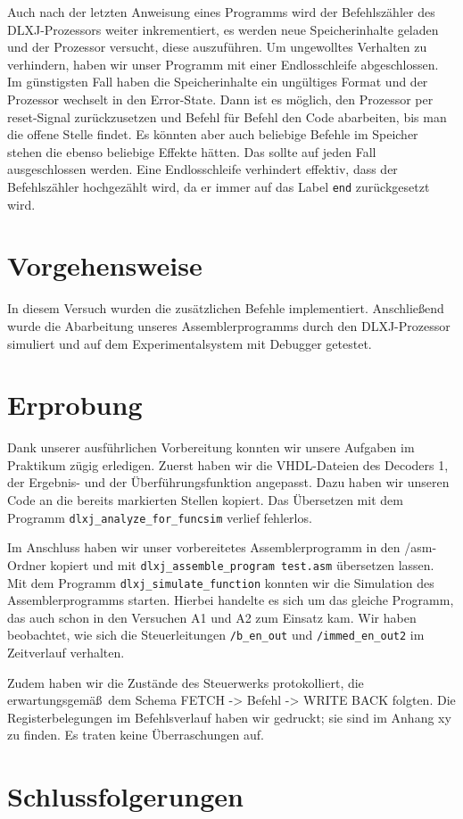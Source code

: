 \documentclass[12pt,a4paper]{scrartcl}
\begin{document}
Auch nach der letzten Anweisung eines Programms wird der Befehlsz\"ahler des DLXJ-Prozessors weiter inkrementiert, es werden neue Speicherinhalte geladen und der Prozessor versucht, diese auszuf\"uhren.
Um ungewolltes Verhalten zu verhindern, haben wir unser Programm mit einer Endlosschleife abgeschlossen.
Im g\"unstigsten Fall haben die Speicherinhalte ein ung\"ultiges Format und der Prozessor wechselt in den Error-State.
Dann ist es m\"oglich, den Prozessor per reset-Signal zur\"uckzusetzen und Befehl f\"ur Befehl den Code abarbeiten, bis man die offene Stelle findet.
Es k\"onnten aber auch beliebige Befehle im Speicher stehen die ebenso beliebige Effekte h\"atten.
Das sollte auf jeden Fall ausgeschlossen werden.
Eine Endlosschleife verhindert effektiv, dass der Befehlsz\"ahler hochgez\"ahlt wird, da er immer auf das Label \texttt{end} zur\"uckgesetzt wird.

\section{Vorgehensweise}
In diesem Versuch wurden die zus\"atzlichen Befehle implementiert.
Anschlie\ss end wurde die Abarbeitung unseres Assemblerprogramms durch den DLXJ-Prozessor simuliert und auf dem Experimentalsystem mit Debugger getestet.

\section{Erprobung}
Dank unserer ausf\"uhrlichen Vorbereitung konnten wir unsere Aufgaben im Praktikum z\"ugig erledigen.
Zuerst haben wir die VHDL-Dateien des Decoders 1, der Ergebnis- und der \"Uberf\"uhrungsfunktion angepasst.
Dazu haben wir unseren Code an die bereits markierten Stellen kopiert.
Das \"Ubersetzen mit dem Programm \texttt{dlxj\_analyze\_for\_funcsim} verlief fehlerlos.

Im Anschluss haben wir unser vorbereitetes Assemblerprogramm in den /asm-Ordner kopiert und mit \texttt{dlxj\_assemble\_program test.asm} \"ubersetzen lassen.
Mit dem Programm \texttt{dlxj\_simulate\_function} konnten wir die Simulation des Assemblerprogramms starten.
Hierbei handelte es sich um das gleiche Programm, das auch schon in den Versuchen A1 und A2 zum Einsatz kam.
Wir haben beobachtet, wie sich die Steuerleitungen \texttt{/b\_en\_out} und \texttt{/immed\_en\_out2} im Zeitverlauf verhalten.

Zudem haben wir die Zust\"ande des Steuerwerks protokolliert, die erwartungsgem\"a\ss\  dem Schema FETCH -> Befehl -> WRITE BACK folgten.
Die Registerbelegungen im Befehlsverlauf haben wir gedruckt; sie sind im Anhang xy zu finden.
Es traten keine \"Uberraschungen auf.


\section{Schlussfolgerungen}
\end{document}
